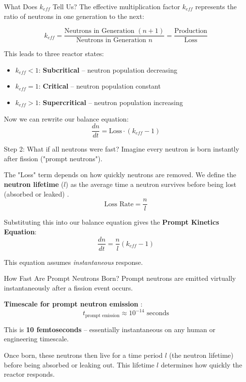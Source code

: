 \documentclass[aspectratio=169]{beamer}
\begin{document}
\begin{frame}[allowframebreaks]{What Does $k_{eff}$ Tell Us?}
    The effective multiplication factor $k_{eff}$ represents the ratio of neutrons in one generation to the next:

    $$ k_{eff} = \frac{\text{Neutrons in Generation } (n+1)}{\text{Neutrons in Generation } n} = \frac{\text{Production}}{\text{Loss}} $$

    \vspace{1em}
    This leads to three reactor states:
    \begin{itemize}
        \item $k_{eff} < 1$: \textbf{Subcritical} – neutron population decreasing
        \item $k_{eff} = 1$: \textbf{Critical} – neutron population constant
        \item $k_{eff} > 1$: \textbf{Supercritical} – neutron population increasing
    \end{itemize}

    \vspace{1em}
    Now we can rewrite our balance equation:
    $$ \frac{dn}{dt} = \text{Loss} \cdot (k_{eff} - 1) $$
\end{frame}

\begin{frame}[allowframebreaks]{Step 2: What if all neutrons were fast?}
    Imagine every neutron is born instantly after fission ("prompt neutrons").

    The "Loss" term depends on how quickly neutrons are removed. We define the \textbf{neutron lifetime} ($l$) as the average time a neutron survives before being lost (absorbed or leaked) \cite{lamarsh2001introduction}.
    $$ \text{Loss Rate} = \frac{n}{l} $$

    Substituting this into our balance equation gives the \textbf{Prompt Kinetics Equation}:
    $$ \frac{dn}{dt} = \frac{n}{l} (k_{eff} - 1) $$

    This equation assumes \textit{instantaneous} response.
\end{frame}

\begin{frame}[allowframebreaks]{How Fast Are Prompt Neutrons Born?}
    Prompt neutrons are emitted virtually instantaneously after a fission event occurs.

    \vspace{1em}
    \textbf{Timescale for prompt neutron emission} \cite{mihalczo2004radiation}:
    $$ t_{\text{prompt emission}} \approx 10^{-14} \text{ seconds} $$

    \vspace{1em}
    This is \textbf{10 femtoseconds} – essentially instantaneous on any human or engineering timescale.

    \vspace{1em}
    Once born, these neutrons then live for a time period $l$ (the neutron lifetime) before being absorbed or leaking out. This lifetime $l$ determines how quickly the reactor responds.
\end{frame}
\end{document}
